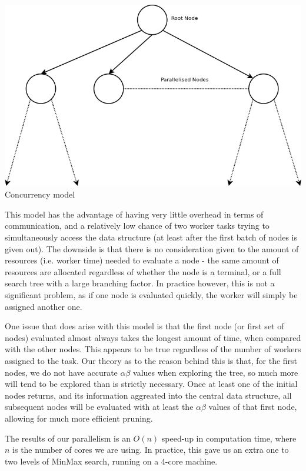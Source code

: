 \documentclass[10pt]{report}
\begin{document}
\begin{multicols}{2}
\begin{center}
\includegraphics[scale=0.31]{concurrency.png}
\\Concurrency model
\end{center}

This model has the advantage of having very little overhead in terms of communication, and a relatively low chance of two worker tasks trying to simultaneously access the data structure (at least after the first batch of nodes is given out). The downside is that there is no consideration given to the amount of resources (i.e. worker time) needed to evaluate a node - the same amount of resources are allocated regardless of whether the node is a terminal, or a full search tree with a large branching factor. In practice however, this is not a significant problem, as if one node is evaluated quickly, the worker will simply be assigned another one.

One issue that does arise with this model is that the first node (or first set of nodes) evaluated almost always takes the longest amount of time, when compared with the other nodes. This appears to be true regardless of the number of workers assigned to the task. Our theory as to the reason behind this is that, for the first nodes, we do not have accurate $\alpha\beta$ values when exploring the tree, so much more will tend to be explored than is strictly necessary. Once at least one of the initial nodes returns, and its information aggreated into the central data structure, all subsequent nodes will be evaluated with at least the $\alpha\beta$ values of that first node, allowing for much more efficient pruning.

The results of our parallelism is an $O(n)$ speed-up in computation time, where $n$ is the number of cores we are using. In practice, this gave us an extra one to two levels of MinMax search, running on a 4-core machine.


\end{multicols}
\end{document}
